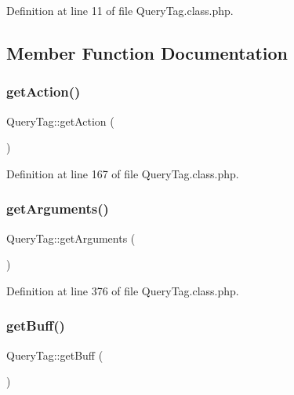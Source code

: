 Definition at line 11 of file Query\+Tag.\+class.\+php.



\subsection{Member Function Documentation}
\mbox{\label{classQueryTag_aee7e1d09d7e7dbb192989c8011160a9c}} 
\subsubsection{\texorpdfstring{get\+Action()}{getAction()}}
{\footnotesize\ttfamily Query\+Tag\+::get\+Action (\begin{DoxyParamCaption}{ }\end{DoxyParamCaption})}



Definition at line 167 of file Query\+Tag.\+class.\+php.

\mbox{\label{classQueryTag_a96fe5aa277e258437e33b5420ab70eac}} 
\subsubsection{\texorpdfstring{get\+Arguments()}{getArguments()}}
{\footnotesize\ttfamily Query\+Tag\+::get\+Arguments (\begin{DoxyParamCaption}{ }\end{DoxyParamCaption})}



Definition at line 376 of file Query\+Tag.\+class.\+php.

\mbox{\label{classQueryTag_a15d995debc8f428419731182b9df6205}} 
\subsubsection{\texorpdfstring{get\+Buff()}{getBuff()}}
{\footnotesize\ttfamily Query\+Tag\+::get\+Buff (\begin{DoxyParamCaption}{ }\end{DoxyParamCaption})}



